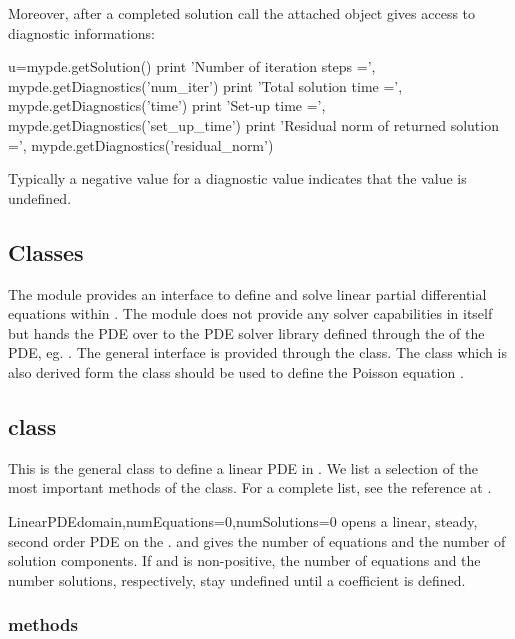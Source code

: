Moreover, after a completed solution call
the attached  \SolverOptions object gives access to diagnostic informations: 
\begin{python}
u=mypde.getSolution()
print 'Number of iteration steps =', mypde.getDiagnostics('num_iter')
print 'Total solution time =', mypde.getDiagnostics('time')
print 'Set-up time =', mypde.getDiagnostics('set_up_time')
print 'Residual norm of returned solution =', mypde.getDiagnostics('residual_norm')
\end{python}
Typically a negative value for a diagnostic value indicates that the value is undefined.

\subsection{Classes}
The module \linearPDEs provides an interface to define and solve linear partial
differential equations within \escript. The module \linearPDEs does not provide any
solver capabilities in itself but hands the PDE over to
the PDE solver library defined through the \Domain of the PDE, eg. \finley.
The general interface is provided through the \LinearPDE class. The \Poisson
class which is also derived form the \LinearPDE class should be used
to define the Poisson equation .

\subsection{\LinearPDE class}
This is the general class to define a linear PDE in \escript. We list a selection of the most
important methods of the class. For a complete list, see the reference at \ReferenceGuide.

\begin{classdesc}{LinearPDE}{domain,numEquations=0,numSolutions=0}
opens a linear, steady, second order PDE on the \Domain {}. 
and  gives the number of equations and the number of solution components.
If  and  is non-positive, the number of equations
and the number solutions, respectively, stay undefined until a coefficient is
defined.
\end{classdesc}

\subsubsection{\LinearPDE methods}

